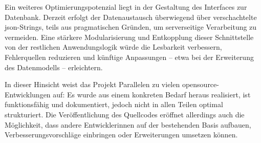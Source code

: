Ein weiteres Optimierungspotenzial liegt in der Gestaltung des Interfaces zur Datenbank. Derzeit erfolgt der Datenaustausch überwiegend über verschachtelte \gls{json}-Strings, teils aus pragmatischen Gründen, um serverseitige Verarbeitung zu vermeiden. Eine stärkere Modularisierung und Entkopplung dieser Schnittstelle von der restlichen Anwendungslogik würde die Lesbarkeit verbessern, Fehlerquellen reduzieren und künftige Anpassungen -- etwa bei der Erweiterung des Datenmodells -- erleichtern.

In dieser Hinsicht weist das Projekt Parallelen zu vielen \gls{opensource}-Entwicklungen auf: Es wurde aus einem konkreten Bedarf heraus realisiert, ist funktionsfähig und dokumentiert, jedoch nicht in allen Teilen optimal strukturiert. Die Veröffentlichung des Quellcodes eröffnet allerdings auch die Möglichkeit, dass andere Entwickler\genderstern innen auf der bestehenden Basis aufbauen, Verbesserungsvorschläge einbringen oder Erweiterungen umsetzen können.
